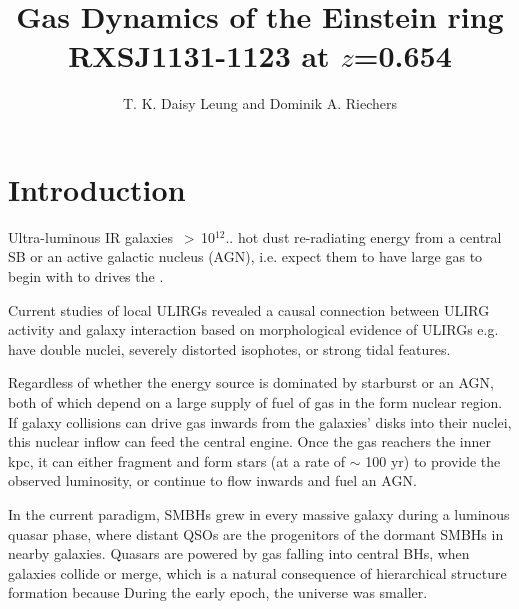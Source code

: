 \documentclass[]{emulateapj}
\begin{document}

\title{Gas Dynamics of the Einstein ring RXSJ1131-1123 at $z$=0.654}
\author{T. K. Daisy Leung and Dominik A. Riechers}


\begin{abstract}
\end{abstract}


  
\section{Introduction}
Ultra-luminous IR galaxies \LIR\,$>$\,10$^{12}$\Lsun.. hot dust re-radiating energy from a central SB or an active galactic 
nucleus (AGN), i.e. expect them to have large gas to begin with to drives the \LIR.

Current studies of local ULIRGs revealed a causal connection between ULIRG activity and galaxy interaction based on morphological evidence of ULIRGs e.g. have double nuclei, severely distorted isophotes, or strong tidal features.

Regardless of whether the energy source is dominated by starburst or an AGN, both of which depend on a large supply of fuel of gas 
in the form nuclear region. If galaxy collisions can drive gas inwards from the galaxies' disks into their nuclei, this nuclear inflow can feed the 
central engine. Once the gas reachers the inner kpc, it can either fragment and form stars (at a rate of $\sim$ 100 \Msun yr\pmOne) to 
provide the observed luminosity, or continue to flow inwards and fuel an AGN.

In the current paradigm, SMBHs grew in every massive galaxy during a luminous quasar phase, where distant QSOs are the 
progenitors of the dormant SMBHs in nearby galaxies. Quasars are powered by gas falling into central BHs, when galaxies 
collide or merge, which is a natural consequence of hierarchical structure formation because During the early epoch, the 
universe was smaller.
\end{document}
